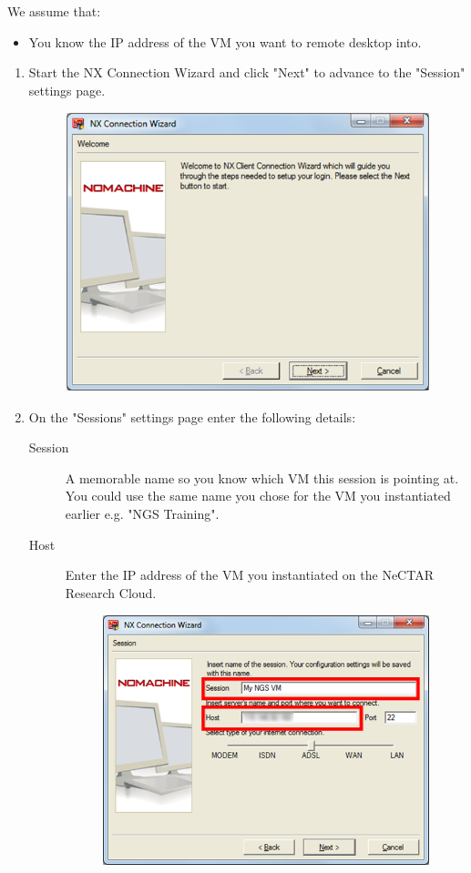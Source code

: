 We assume that:
\begin{itemize}
\item You know the IP address of the VM you want to remote desktop into.
\end{itemize}

\begin{enumerate}
  \item Start the NX Connection Wizard and click "Next" to advance to the
  "Session" settings page.
  \begin{figure}[H]
    \centering
    \includegraphics[scale=0.5]{post-workshop/nx_client/start_wizard.png}
    \label{fig:nx_start_wizard}
  \end{figure}
  \item On the "Sessions" settings page enter the following details:
  \begin{description}
  \item[Session] A memorable name so you know which VM this session is pointing
  at. You could use the same name you chose for the VM you instantiated earlier
  e.g. "NGS Training".
  \item[Host] Enter the IP address of the VM you instantiated on the NeCTAR
  Research Cloud.
  \begin{figure}[H]
    \centering
    \includegraphics[scale=0.5]{post-workshop/nx_client/session_configuration.png}

\end{figure}
\end{description}
\end{enumerate}
